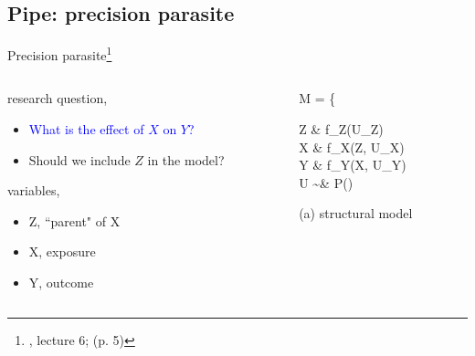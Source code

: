 %
%
\subsection{Pipe: precision parasite}
%
%
\begin{frame}[t, negative]
	\subsectionpage
\end{frame}
%
%
\begin{frame}
	{Precision parasite\footnote{\citet{McElreath_2022}, lecture 6; \citet{Cinelli_et_al_2021} (p. 5)}}
	\begin{columns}
		\begin{column}{0.5\textwidth}
			research question, 
			\begin{itemize}
				\item \textcolor{blue}{What is the effect of $X$ on $Y$?}
				\item Should we include $Z$ in the model?
			\end{itemize}
			
			variables,
			\begin{itemize}
				\item Z, ``parent" of X
				\item X, exposure
				\item Y, outcome
			\end{itemize}
		\end{column}
		\begin{column}{0.5\textwidth}  
			\begin{equ}
				M = \left\{ \begin{aligned} 
					Z \leftarrow & \; f_{Z}(U_{Z}) \\
					X \leftarrow & \; f_{X}(Z, U_{X}) \\
					Y \leftarrow & \; f_{Y}(X, U_{Y}) \\
					U \sim & \; P()
				\end{aligned} \right
				\caption*{(a) structural model}
			\end{equ}
			\begin{figure}
\end{figure}
\end{column}
\end{columns}
\end{frame}
